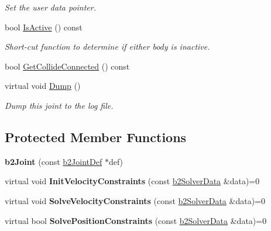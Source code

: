 \begin{DoxyCompactItemize}
\begin{DoxyCompactList}\small\item\em Set the user data pointer. \end{DoxyCompactList}\item 
\hypertarget{classb2_joint_a825d3a6abb32014f31fd622f2bfc0363}{bool \hyperlink{classb2_joint_a825d3a6abb32014f31fd622f2bfc0363}{Is\-Active} () const }\label{classb2_joint_a825d3a6abb32014f31fd622f2bfc0363}

\begin{DoxyCompactList}\small\item\em Short-\/cut function to determine if either body is inactive. \end{DoxyCompactList}\item 
bool \hyperlink{classb2_joint_a09c6bdfa5842522ba381bac8dd559f4d}{Get\-Collide\-Connected} () const 
\item 
\hypertarget{classb2_joint_abd35e7316017ad9a40d5dbf9b5ba3f36}{virtual void \hyperlink{classb2_joint_abd35e7316017ad9a40d5dbf9b5ba3f36}{Dump} ()}\label{classb2_joint_abd35e7316017ad9a40d5dbf9b5ba3f36}

\begin{DoxyCompactList}\small\item\em Dump this joint to the log file. \end{DoxyCompactList}\end{DoxyCompactItemize}
\subsection*{Protected Member Functions}
\begin{DoxyCompactItemize}
\item 
\hypertarget{classb2_joint_a8d6cce91546335fe95325d5e29c06a19}{{\bfseries b2\-Joint} (const \hyperlink{structb2_joint_def}{b2\-Joint\-Def} $\ast$def)}\label{classb2_joint_a8d6cce91546335fe95325d5e29c06a19}

\item 
\hypertarget{classb2_joint_a599c013de5514e02684b958b31dd76a4}{virtual void {\bfseries Init\-Velocity\-Constraints} (const \hyperlink{structb2_solver_data}{b2\-Solver\-Data} \&data)=0}\label{classb2_joint_a599c013de5514e02684b958b31dd76a4}

\item 
\hypertarget{classb2_joint_ad302c8d02efcfe934158de0dc429348d}{virtual void {\bfseries Solve\-Velocity\-Constraints} (const \hyperlink{structb2_solver_data}{b2\-Solver\-Data} \&data)=0}\label{classb2_joint_ad302c8d02efcfe934158de0dc429348d}

\item 
\hypertarget{classb2_joint_af767ac9aa494bd15cdf83dfe3e487d9c}{virtual bool {\bfseries Solve\-Position\-Constraints} (const \hyperlink{structb2_solver_data}{b2\-Solver\-Data} \&data)=0}\label{classb2_joint_af767ac9aa494bd15cdf83dfe3e487d9c}

\end{DoxyCompactItemize}

